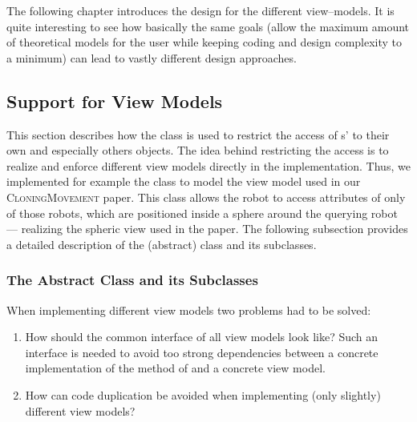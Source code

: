 The following chapter introduces the design for the different view--models. It is quite interesting to see how basically the same goals (allow the maximum amount of theoretical models for the user while keeping coding and design complexity to a minimum) can lead to vastly different design approaches.

\subsection{Support for View Models} \label{sec:views}
This section describes how the  class is used to restrict the access of s' to their own and especially others  objects. The idea behind restricting the access is to realize and enforce different view models directly in the implementation. Thus, we implemented for example the class  to model the view model used in our \textsc{CloningMovement} paper. This class allows the robot to access attributes of  only of those robots, which are positioned inside a sphere around the querying robot --- realizing the spheric view used in the paper. The following subsection provides a detailed description of the (abstract)  class and its subclasses.

\subsubsection{The Abstract  Class and its Subclasses}
When implementing different view models two problems had to be solved: 
\begin{enumerate}
\item
	How should the common interface of all view models look like? Such an interface is needed to avoid too strong dependencies between a concrete implementation of the  method of  and a concrete view model.
	
\item
	How can code duplication be avoided when implementing (only slightly) different view models?
\end{enumerate}

